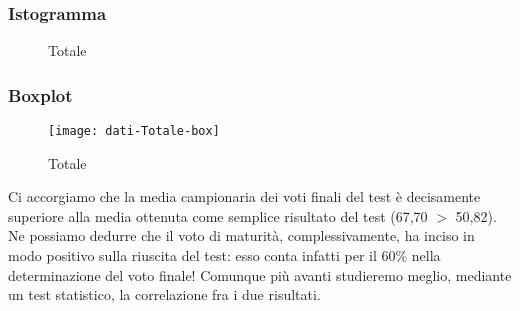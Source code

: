 \subsubsection{Istogramma}
\begin{figure}[!h]
  \caption{Totale}
\end{figure}

\subsubsection{Boxplot}
\begin{figure}[!h]
  \centering
  \texttt{[image: dati-Totale-box]}
  \caption{Totale}
\end{figure}
Ci accorgiamo che la media campionaria dei voti finali del test è decisamente superiore alla media ottenuta come semplice risultato del test (67,70 $>$ 50,82). Ne possiamo dedurre che il voto di maturità, complessivamente, ha inciso in modo positivo sulla riuscita del test: esso conta infatti per il 60\%  nella determinazione del voto finale! Comunque più avanti studieremo meglio, mediante un test statistico, la correlazione fra i due risultati.
\restoregeometry
\clearpage

